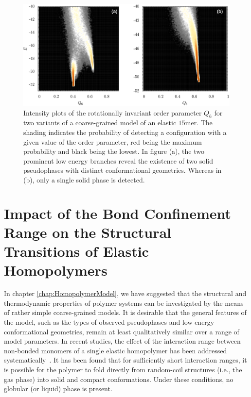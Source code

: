 \documentclass[12pt]{report}
\begin{document}
\begin{figure}
\center
\includegraphics[width = 1.01\textwidth]{chapter4Figs/q6.eps}
\caption{\label{fig:orderParameters}%
Intensity plots of the rotationally invariant order parameter $Q_{6}$ for two variants of a coarse-grained model of an elastic $15$mer. The shading indicates the probability of detecting a configuration with a given value of the order parameter, red being the maximum probability and black being the lowest. In figure (a), the two prominent low energy branches reveal the existence of two solid pseudophases with distinct conformational geometries. Whereas in (b), only a single solid phase is detected.
}
\end{figure}
% 










\chapter{Impact of the Bond Confinement Range on the Structural Transitions of Elastic Homopolymers}
\label{chap:bondFluct}

In chapter \ref{chap:HomopolymerModel}, we have suggested that the structural and thermodynamic properties of polymer systems can be investigated by the means of rather simple coarse-grained models. It is desirable that the general features of the model, such as the types of observed pseudophases and low-energy conformational geometries, remain at least qualitatively similar over a range of model parameters. In recent studies, the effect of the interaction range between non-bonded monomers of a single elastic homopolymer has been addressed systematically~\cite{taylorRange1,taylorRange2,Gross2013}. It has been found that for sufficiently short interaction ranges, it is possible for the polymer to fold directly from random-coil structures (i.e., the gas phase) into solid and compact conformations. Under these conditions, no globular (or liquid) phase is present.
\end{document}
